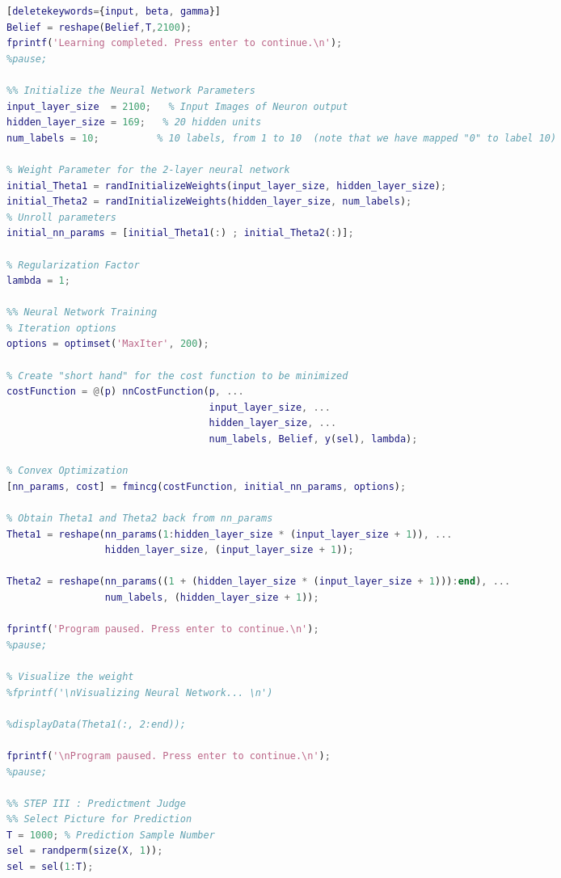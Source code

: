 \begin{spacing}{1}
\begin{lstlisting}[language=Matlab][deletekeywords={input, beta, gamma}]
Belief = reshape(Belief,T,2100);
fprintf('Learning completed. Press enter to continue.\n');
%pause;

%% Initialize the Neural Network Parameters
input_layer_size  = 2100;   % Input Images of Neuron output
hidden_layer_size = 169;   % 20 hidden units
num_labels = 10;          % 10 labels, from 1 to 10  (note that we have mapped "0" to label 10)

% Weight Parameter for the 2-layer neural network
initial_Theta1 = randInitializeWeights(input_layer_size, hidden_layer_size);
initial_Theta2 = randInitializeWeights(hidden_layer_size, num_labels);
% Unroll parameters 
initial_nn_params = [initial_Theta1(:) ; initial_Theta2(:)];

% Regularization Factor
lambda = 1;

%% Neural Network Training
% Iteration options
options = optimset('MaxIter', 200);

% Create "short hand" for the cost function to be minimized
costFunction = @(p) nnCostFunction(p, ...
                                   input_layer_size, ...
                                   hidden_layer_size, ...
                                   num_labels, Belief, y(sel), lambda);

% Convex Optimization
[nn_params, cost] = fmincg(costFunction, initial_nn_params, options);

% Obtain Theta1 and Theta2 back from nn_params
Theta1 = reshape(nn_params(1:hidden_layer_size * (input_layer_size + 1)), ...
                 hidden_layer_size, (input_layer_size + 1));

Theta2 = reshape(nn_params((1 + (hidden_layer_size * (input_layer_size + 1))):end), ...
                 num_labels, (hidden_layer_size + 1));

fprintf('Program paused. Press enter to continue.\n');
%pause;

% Visualize the weight
%fprintf('\nVisualizing Neural Network... \n')

%displayData(Theta1(:, 2:end));

fprintf('\nProgram paused. Press enter to continue.\n');
%pause;

%% STEP III : Predictment Judge
%% Select Picture for Prediction
T = 1000; % Prediction Sample Number
sel = randperm(size(X, 1));
sel = sel(1:T);


\end{lstlisting}
\end{spacing}
